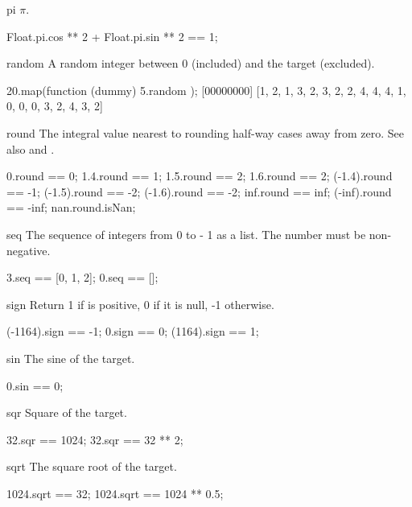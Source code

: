 \begin{urbiscriptapi}
\item[pi]
  $\pi$.
\begin{urbiassert}
Float.pi.cos ** 2 + Float.pi.sin ** 2 == 1;
\end{urbiassert}

\item[random]
  A random integer between 0 (included) and the target (excluded).
\begin{urbiscript}
20.map(function (dummy) { 5.random });
[00000000] [1, 2, 1, 3, 2, 3, 2, 2, 4, 4, 4, 1, 0, 0, 0, 3, 2, 4, 3, 2]
\end{urbiscript}

\item[round] The integral value nearest to \this rounding half-way cases
  away from zero.  See also  and .
\begin{urbiassert}
     0.round ==  0;
   1.4.round ==  1;     1.5.round ==  2;    1.6.round ==  2;
(-1.4).round == -1;  (-1.5).round == -2; (-1.6).round == -2;
   inf.round == inf; (-inf).round == -inf;
   nan.round.isNan;
\end{urbiassert}

\item[seq]
  The sequence of integers from 0 to \this - 1 as a list.
  The number must be non-negative.
\begin{urbiassert}
3.seq == [0, 1, 2];
0.seq == [];
\end{urbiassert}

\item[sign]
  Return 1 if \this is positive, 0 if it is null, -1
  otherwise.
\begin{urbiassert}
(-1164).sign == -1;
0.sign       == 0;
(1164).sign  == 1;
\end{urbiassert}

\item[sin]
  The sine of the target.
\begin{urbiassert}
0.sin == 0;
\end{urbiassert}

\item[sqr]
  Square of the target.
\begin{urbiassert}
32.sqr == 1024;
32.sqr == 32 ** 2;
\end{urbiassert}

\item[sqrt]
  The square root of the target.
\begin{urbiassert}
1024.sqrt == 32;
1024.sqrt == 1024 ** 0.5;
\end{urbiassert}


\end{urbiscriptapi}
